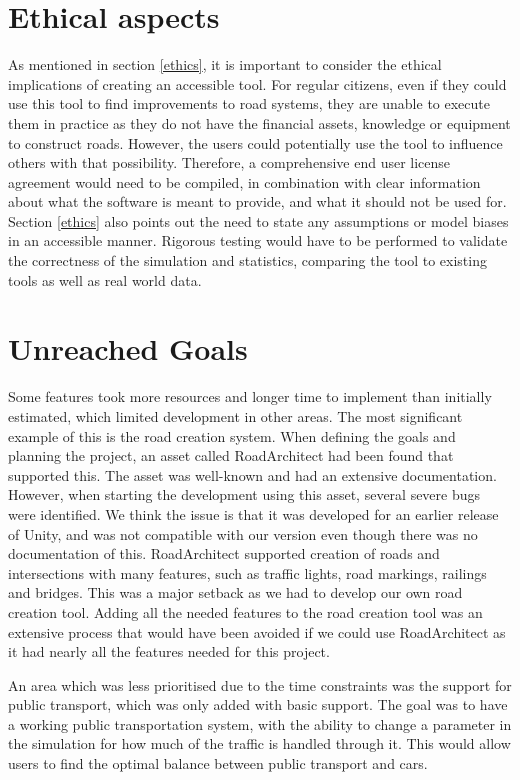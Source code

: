\section{Ethical aspects}
    As mentioned in section \ref{ethics}, it is important to consider the ethical implications of creating an accessible tool. For regular citizens, even if they could use this tool to find improvements to road systems, they are unable to execute them in practice as they do not have the financial assets, knowledge or equipment to construct roads. However, the users could potentially use the tool to influence others with that possibility. Therefore, a comprehensive end user license agreement would need to be compiled, in combination with clear information about what the software is meant to provide, and what it should not be used for. Section \ref{ethics} also points out the need to state any assumptions or model biases in an accessible manner. Rigorous testing would have to be performed to validate the correctness of the simulation and statistics, comparing the tool to existing tools as well as real world data.


\section{Unreached Goals}
    Some features took more resources and longer time to implement than initially estimated, which limited development in other areas. The most significant example of this is the road creation system. When defining the goals and planning the project, an asset called RoadArchitect had been found that supported this\cite{road-architect}. The asset was well-known and had an extensive documentation. However, when starting the development using this asset, several severe bugs were identified. We think the issue is that it was developed for an earlier release of Unity, and was not compatible with our version even though there was no documentation of this. RoadArchitect supported creation of roads and intersections with many features, such as traffic lights, road markings, railings and bridges. This was a major setback as we had to develop our own road creation tool. Adding all the needed features to the road creation tool was an extensive process that would have been avoided if we could use RoadArchitect as it had nearly all the features needed for this project.

    An area which was less prioritised due to the time constraints was the support for public transport, which was only added with basic support. The goal was to have a working public transportation system, with the ability to change a parameter in the simulation for how much of the traffic is handled through it. This would allow users to find the optimal balance between public transport and cars.


